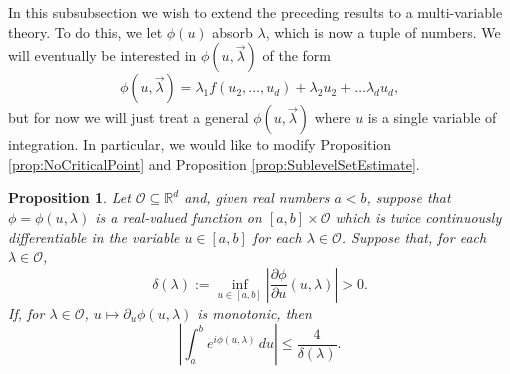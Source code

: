 \documentclass[11pt, letter]{book}
\newtheorem{proposition}[theorem]{Proposition}
\begin{document}
In this subsubsection we wish to extend the preceding results to a multi-variable theory. To do this, we let $\phi(u)$ absorb $\lambda$, which is now a tuple of numbers. We will eventually be interested in $\phi(u,\vec{\lambda})$ of the form
\begin{equation*}
    \phi(u,\vec{\lambda}) = \lambda_1 f(u_2,\dots,u_d) + \lambda_2 u_2 + \dots \lambda_d u_d,
\end{equation*}
but for now we will just treat a general $\phi(u,\vec{\lambda})$ where $u$ is a single variable of integration. In particular, we would like to modify Proposition \ref{prop:NoCriticalPoint} and Proposition \ref{prop:SublevelSetEstimate}.
\begin{framed}
\begin{proposition}\label{prop:LambdaNoCriticalPoint} 
Let $\mathcal{O}\subseteq\mathbb{R}^d$ and, given real numbers $a<b$, suppose that $\phi=\phi(u,\lambda)$ is a real-valued function on $[a,b]\times\mathcal{O}$ which is twice continuously differentiable in the variable $u\in [a,b]$ for each $\lambda\in\mathcal{O}$. Suppose that, for each $\lambda\in\mathcal{O}$,
\begin{equation*}
    \delta(\lambda):=\inf_{u\in[a,b]}\left|\frac{\partial \phi}{\partial u}(u,\lambda)\right|>0.
\end{equation*}
If, for $\lambda\in\mathcal{O}$, $u\mapsto \partial_u \phi (u,\lambda)$ is monotonic, then
\begin{equation*}
    \left|\int_a^b e^{i\phi(u,\lambda)}\,du\right|\leq \frac{4}{\delta(\lambda)}.
\end{equation*}
\end{proposition}
\end{framed}
\end{document}
